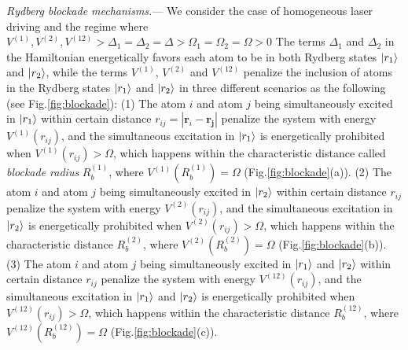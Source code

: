 \documentclass[%
 reprint,
nofootinbib,
 amsmath,amssymb,
 aps,
pra,
floatfix,
]{revtex4-2}
\begin{document}
\emph{Rydberg blockade mechanisms.}--- We consider the case of homogeneous laser driving and the regime where $V^{(1)},V^{(2)},V^{(12)} > \Delta_1=\Delta_2 =\Delta > \Omega_1=\Omega_2=\Omega > 0$ The terms $\Delta_1$ and $\Delta_2$ in the Hamiltonian energetically favors each atom to be in both Rydberg states $\ket{r_1}$ and $\ket{r_2}$, while the terms $V^{(1)}$, $V^{(2)}$ and $V^{(12)}$ penalize the inclusion of atoms in the Rydberg states $\ket{r_1}$ and $\ket{r_2}$ in three different scenarios as the following (see Fig.\ref{fig:blockade}): (1) The atom $i$ and atom $j$ being simultaneously excited in $\ket{r_1}$ within certain distance $r_{ij}=|\boldsymbol{r}_i-\boldsymbol{r_j}|$ penalize the system with energy $V^{(1)}(r_{ij})$, and the simultaneous excitation in $\ket{r_1}$ is energetically prohibited when $V^{(1)}(r_{ij})>\Omega$, which happens within the characteristic distance called \emph{blockade radius} $R^{(1)}_b$, where $V^{(1)}(R^{(1)}_b)=\Omega$ (Fig.\ref{fig:blockade}(a)). (2) The atom $i$ and atom $j$ being simultaneously excited in $\ket{r_2}$ within certain distance $r_{ij}$ penalize the system with energy $V^{(2)}(r_{ij})$, and the simultaneous excitation in $\ket{r_2}$ is energetically prohibited when $V^{(2)}(r_{ij})>\Omega$, which happens within the characteristic distance $R^{(2)}_b$, where $V^{(2)}(R^{(2)}_b)=\Omega$ (Fig.\ref{fig:blockade}(b)). (3) The atom $i$ and atom $j$ being simultaneously excited in $\ket{r_1}$ and $\ket{r_2}$ within certain distance $r_{ij}$ penalize the system with energy $V^{(12)}(r_{ij})$, and the simultaneous excitation in $\ket{r_1}$ and $\ket{r_2}$ is energetically prohibited when $V^{(12)}(r_{ij})>\Omega$, which happens within the characteristic distance $R^{(12)}_b$, where $V^{(12)}(R^{(12)}_b)=\Omega$ (Fig.\ref{fig:blockade}(c)).
\end{document}
